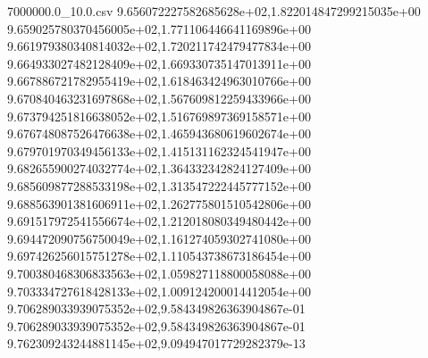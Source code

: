 \begin{filecontents*}{7000000.0_10.0.csv}
9.656072227582685628e+02,1.822014847299215035e+00
9.659025780370456005e+02,1.771106446641169896e+00
9.661979380340814032e+02,1.720211742479477834e+00
9.664933027482128409e+02,1.669330735147013911e+00
9.667886721782955419e+02,1.618463424963010766e+00
9.670840463231697868e+02,1.567609812259433966e+00
9.673794251816638052e+02,1.516769897369158571e+00
9.676748087526476638e+02,1.465943680619602674e+00
9.679701970349456133e+02,1.415131162324541947e+00
9.682655900274032774e+02,1.364332342824127409e+00
9.685609877288533198e+02,1.313547222445777152e+00
9.688563901381606911e+02,1.262775801510542806e+00
9.691517972541556674e+02,1.212018080349480442e+00
9.694472090756750049e+02,1.161274059302741080e+00
9.697426256015751278e+02,1.110543738673186454e+00
9.700380468306833563e+02,1.059827118800058088e+00
9.703334727618428133e+02,1.009124200014412054e+00
9.706289033939075352e+02,9.584349826363904867e-01
9.706289033939075352e+02,9.584349826363904867e-01
9.762309243244881145e+02,9.094947017729282379e-13
\end{filecontents*}

